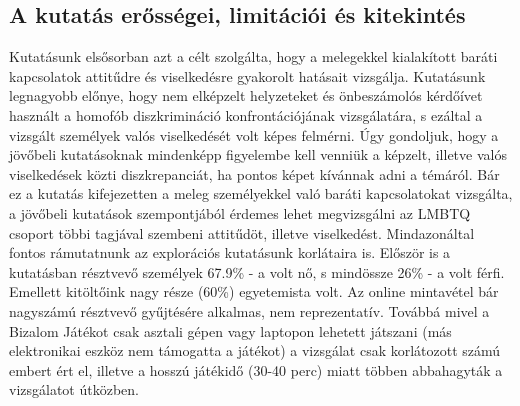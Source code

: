\subsection{A kutatás erősségei, limitációi és kitekintés}
Kutatásunk elsősorban azt a célt szolgálta, hogy a melegekkel kialakított baráti kapcsolatok attitűdre és viselkedésre gyakorolt hatásait vizsgálja.
Kutatásunk legnagyobb előnye, hogy nem elképzelt helyzeteket és önbeszámolós kérdőívet használt a homofób diszkrimináció konfrontációjának vizsgálatára, s ezáltal a vizsgált személyek valós viselkedését volt képes felmérni. Úgy gondoljuk, hogy a jövőbeli kutatásoknak mindenképp figyelembe kell venniük a képzelt, illetve valós viselkedések közti diszkrepanciát, ha pontos képet kívánnak adni a témáról. Bár ez a kutatás kifejezetten a meleg személyekkel való baráti kapcsolatokat vizsgálta, a jövőbeli kutatások szempontjából érdemes lehet megvizsgálni az LMBTQ csoport többi tagjával szembeni attitűdöt, illetve viselkedést.
Mindazonáltal fontos rámutatnunk az explorációs kutatásunk korlátaira is. Először is a kutatásban résztvevő személyek 67.9\% - a volt nő, s mindössze 26\% - a volt férfi. Emellett kitöltőink nagy része (60\%) egyetemista volt.  Az online mintavétel bár nagyszámú résztvevő gyűjtésére alkalmas, nem reprezentatív. Továbbá mivel a Bizalom Játékot csak asztali gépen vagy laptopon lehetett játszani (más elektronikai eszköz nem támogatta a játékot) a vizsgálat csak korlátozott számú embert ért el, illetve a hosszú játékidő (30-40 perc) miatt többen abbahagyták a vizsgálatot útközben. 



